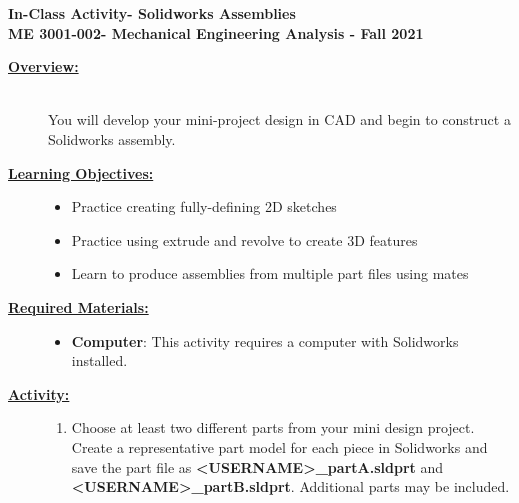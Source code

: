 \documentclass[12pt]{article}
\newcommand{\COURNAME}{ME 3001-002}
\newcommand{\CURRTERM}{Fall 2021} %
\newcommand{\ANUM}{7} %
\newcommand{\activitytitle}{Solidworks Assemblies} %
\begin{document}
\thispagestyle{plain}

\begin{center}
   {\bf \Large In-Class Activity\hspc\ANUM\hspc - \activitytitle}\vspace{3mm}\\
   {\bf \large \COURNAME - Mechanical Engineering Analysis - \CURRTERM} \vspace{5mm}\\
\end{center}

\begin{description}

\item[\textbf{\underline{Overview:}}] \hfill \vspace{3mm}\\
You will develop your mini-project design in CAD and begin to construct a Solidworks assembly.

\item[\textbf{\underline{Learning Objectives:}}] \hfill \vspace{0mm}

\begin{itemize}
	\item Practice creating fully-defining 2D sketches
	\item Practice using extrude and revolve to create 3D features
	\item Learn to produce assemblies from multiple part files using mates
	 
\end{itemize}

\item[\textbf{\underline{Required Materials:}}] \hfill \vspace{0mm}

\begin{itemize}
	\item {\bf Computer}: This activity requires a computer with Solidworks installed.
\end{itemize}

\item[\textbf{\underline{Activity:}}] \hfill \vspace{0mm}

\begin{enumerate}
	

	\item Choose at least two different parts from your mini design project. Create a representative part model for each piece in Solidworks and save the part file as {\bf \BL<USERNAME>\BK\_partA.sldprt} and {\bf \BL<USERNAME>\BK\_partB.sldprt}. Additional parts may be included. 
	

\end{enumerate}
\end{description}
\end{document}
